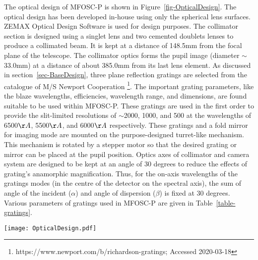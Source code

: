 \par
The optical design of MFOSC-P is shown in Figure~\ref{fig-OpticalDesign}. The optical design has been developed in-house using only the spherical lens surfaces. ZEMAX Optical Design Software is used for design purposes. The collimator section is designed using a singlet lens and two cemented doublets lenses to produce a collimated beam. It is kept at a distance of 148.5mm from the focal plane of the telescope. The collimator optics forms the pupil image (diameter $\sim$33.0mm) at a distance of about 385.0mm from its last lens element. As discussed in section~\ref{sec-BaseDesign}, three plane reflection gratings are selected from the catalogue of M/S Newport Cooperation \footnote{https://www.newport.com/b/richardson-gratings; Accessed 2020-03-18}. The important grating parameters, like the blaze wavelengths, efficiencies, wavelength range, and dimensions, are found suitable to be used within MFOSC-P. These gratings are used in the first order to provide the slit-limited resolutions of $\sim$2000, 1000, and 500 at the wavelengths of 6500$\AA$, 5500$\AA$, and 6000$\AA$ respectively. These gratings and a fold mirror for imaging mode are mounted on the purpose-designed turret-like mechanism. This mechanism is rotated by a stepper motor so that the desired grating or mirror can be placed at the pupil position. Optics axes of collimator and camera system are designed to be kept at an angle of 30 degrees to reduce the effects of grating's anamorphic magnification\citep{Schweizer1979}. Thus, for the on-axis wavelengths of the gratings modes (in the centre of the detector on the spectral axis), the sum of angle of the incident ($\alpha$) and angle of dispersion ($\beta$) is fixed at 30 degrees. Various parameters of gratings used in MFOSC-P are given in Table~\ref{table-gratings}.

\begin{figure*}
	\centering
	\texttt{[image: OpticalDesign.pdf]}
	\vspace{0.2cm}
	\caption{The optical design of MFOSC-P. An additional fold mirror (not shown in the figure) is also kept immediately after the last lens of collimator to fold the design mechanically. Distances mentioned here are to show the scale of the optical system. Exact values are given in Table~\ref{table-OpticsData}.}
	\label{fig-OpticalDesign}
\end{figure*}

